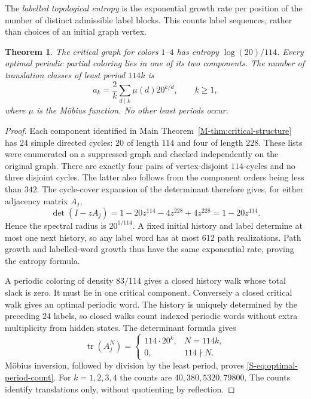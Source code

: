 \documentclass[11pt,reqno]{amsart}
\theoremstyle{plain}
\theoremstyle{plain}
\newtheorem{Stheorem}{Theorem}
\theoremstyle{plain}
\begin{document}
The \emph{labelled topological entropy} is the exponential growth rate
per position of the number of distinct admissible label blocks. This
counts label sequences, rather than choices of an initial graph vertex.

\begin{Stheorem}
The critical graph for colors $1$--$4$ has entropy $\log(20)/114$.
Every optimal periodic partial coloring lies in one of its two components.
The number of translation classes of least period $114k$ is
\begin{equation}\label{S-eq:optimal-period-count}
 a_k=\frac2k\sum_{d\mid k}\mu(d)20^{k/d},\qquad k\ge1,
\end{equation}
where $\mu$ is the M\"obius function. No other least periods occur.
\end{Stheorem}
\begin{proof}
Each component identified in Main Theorem~\ref*{M-thm:critical-structure}
has $24$ simple directed cycles:
$20$ of length $114$ and four of length $228$. These lists were enumerated
on a suppressed graph and checked independently on the original graph.
There are exactly four pairs of vertex-disjoint $114$-cycles and no three
disjoint cycles. The latter also follows from the component orders being
less than $342$. The cycle-cover expansion of the determinant therefore
gives, for either adjacency matrix $A_j$,
\[
 \det(I-zA_j)=1-20z^{114}-4z^{228}+4z^{228}=1-20z^{114}.
\]
Hence the spectral radius is $20^{1/114}$. A fixed initial history and
label determine at most one next history, so any label word has at most
$612$ path realizations. Path growth and labelled-word growth thus have
the same exponential rate, proving the entropy formula.

A periodic coloring of density $83/114$ gives a closed history walk whose
total slack is zero. It must lie in one critical component. Conversely a
closed critical walk gives an optimal periodic word. The history is uniquely
determined by the preceding $24$ labels, so closed walks count indexed
periodic words without extra multiplicity from hidden states. The determinant
formula gives
\[
 \operatorname{tr}(A_j^N)=
 \begin{cases}114\cdot20^k,&N=114k,\\0,&114\nmid N.
 \end{cases}
\]
M\"obius inversion, followed by division by the least period, proves
\eqref{S-eq:optimal-period-count}. For $k=1,2,3,4$ the counts are
$40,380,5320,79800$. The counts identify translations only, without
quotienting by reflection.
\end{proof}
\end{document}
